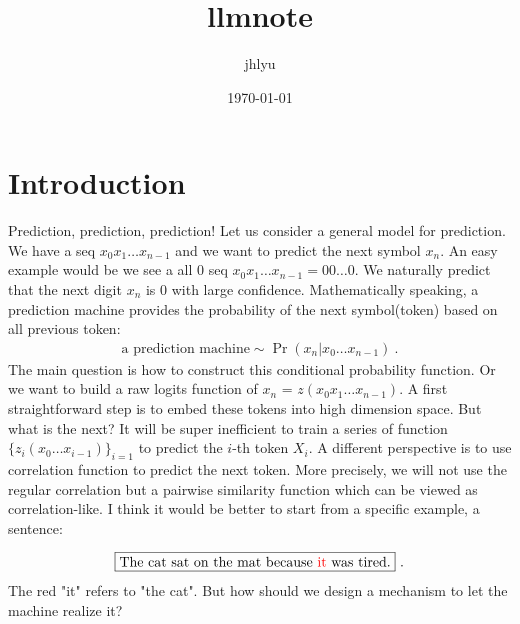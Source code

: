 \documentclass{article}
\title{llmnote}
\author{jhlyu}
\date{\today}
\begin{document}
\maketitle

\section{Introduction}
Prediction, prediction, prediction! Let us consider a general model for prediction. We have a seq \(x_{0}x_{1}\dots x_{n-1}\) and we want to predict the next symbol $x_{n}$. An easy example would be we see a all 0 seq \(x_{0}x_{1}\dots x_{n-1}=00\dots0\). We naturally predict that the next digit \(x_{n}\) is 0 with large confidence. Mathematically speaking, a prediction machine provides the probability of the next symbol(token) based on all previous token:
\begin{align}
    \text{a prediction machine} \sim \Pr(x_{n}|x_{0}\dots x_{n-1})~.
\end{align}
The main question is how to construct this conditional probability function. Or we want to build a raw logits function of \(x_{n}\) = \(z(x_{0}x_{1}\dots x_{n-1})\). A first straightforward step is to embed these tokens into high dimension space. But what is the next? It will be super inefficient to train a series of function \(\{z_i( x_0 \dots x_{i-1})\}_{i=1}\) to predict the \(i\)-th token \(X_{i}\). A different perspective is to use correlation function to predict the next token. More precisely, we will not use the regular correlation but a pairwise similarity function which can be viewed as correlation-like. I think it would be better to start from a specific example, a sentence:

\begin{align}
    \boxed{\text{The cat sat on the mat because } \textcolor{red}{\text{it}} \text{ was tired.}}~.
\end{align}
The red "it" refers to "the cat". But how should we design a mechanism to let the machine realize it?
\end{document}
